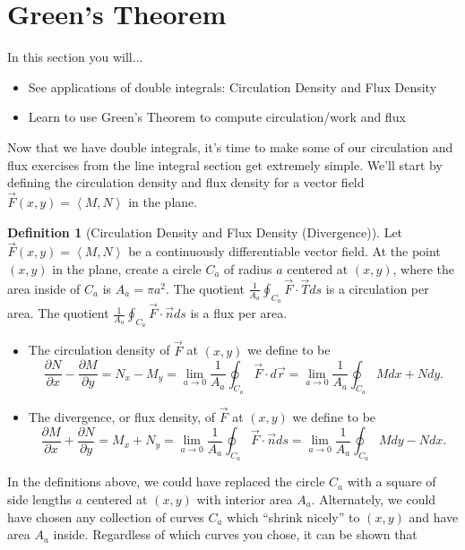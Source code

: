 \documentclass[10pt,]{book}
\theoremstyle{plain}
\theoremstyle{definition}
\newtheorem{definition}[theorem]{Definition}
\theoremstyle{definition}
\theoremstyle{definition}
\theoremstyle{definition}
\theoremstyle{definition}
\numberwithin{equation}{section}
\newcommand{\ds}{\displaystyle}
\newcommand{\lt}{<}
\begin{document}
\section[{Green's Theorem}]{Green's Theorem}\label{section-41}
In this section you will... \leavevmode%
\begin{itemize}[label=\textbullet]
\item{}See applications of double integrals: Circulation Density and Flux Density%
\item{}Learn to use Green's Theorem to compute circulation/work and flux%
\end{itemize}
%
\par
Now that we have double integrals, it's time to make some of our circulation and flux exercises from the line integral section get extremely simple. We'll start by defining the circulation density and flux density for a vector field \(\vec F(x,y)=\left\lt M,N\right>\) in the plane.%
\begin{definition}[{Circulation Density and Flux Density (Divergence)}]\label{definition_of_flux_density_in_2D}
Let \(\vec F(x,y)=\left\lt M,N\right>\) be a continuously differentiable vector field. At the point \((x,y)\) in the plane, create a circle \(C_a\) of radius \(a\) centered at \((x,y)\), where the area inside of \(C_a\) is \(A_a=\pi a^2\). The quotient \(\ds \frac{1}{A_a}\oint_{C_a} \vec F \cdot \vec T ds\) is a circulation per area. The quotient \(\ds \frac{1}{A_a}\oint_{C_a} \vec F \cdot \vec n ds\) is a flux per area. \leavevmode%
\begin{itemize}[label=\textbullet]
\item{}The circulation density of \(\vec F\) at \((x,y)\) we define to be%
\begin{equation*}
\frac{\partial N}{\partial x}-\frac{\partial M}{\partial y}=N_x-M_y = \lim_{a\to 0} \frac{1}{A_a}\oint_{C_a} \vec F \cdot  d\vec r = 
\lim_{a\to 0} \frac{1}{A_a}\oint_{C_a} Mdx+Ndy.
\end{equation*}
%
\item{}The divergence, or flux density, of \(\vec F\) at \((x,y)\) we define to be%
\begin{equation*}
\frac{\partial M}{\partial x}+\frac{\partial N}{\partial y}=M_x+N_y=\lim_{a\to 0} \frac{1}{A_a}\oint_{C_a} \vec F \cdot \vec n ds = 
\lim_{a\to 0} \frac{1}{A_a}\oint_{C_a} Mdy-Ndx.
\end{equation*}
%
\end{itemize}
%
\end{definition}
In the definitions above, we could have replaced the circle \(C_a\) with a square of side lengths \(a\) centered at \((x,y)\) with interior area \(A_a\). Alternately, we could have chosen any collection of curves \(C_a\) which ``shrink nicely'' to \((x,y)\) and have area \(A_a\) inside. Regardless of which curves you chose, it can be shown that%
\end{document}
